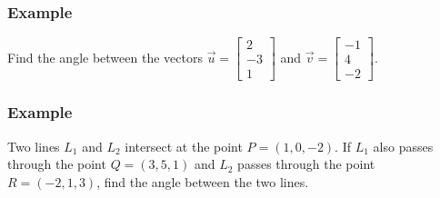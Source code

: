 \documentclass[11pt,t]{beamer}
\begin{document}
\begin{frame}
\frametitle{Example}
Find the angle between the vectors $\vec{u} = \begin{bmatrix}
2\\-3\\1\end{bmatrix}$ and $\vec{v} = \begin{bmatrix}
-1\\4\\-2
\end{bmatrix}$.


\end{frame}
\begin{frame}
\frametitle{Example}

Two lines $L_1$ and $L_2$ intersect at the point $P=(1,0,-2)$. If $L_1$ also passes through the point $Q=(3,5,1)$ and $L_2$ passes through the point $R=(-2,1,3)$, find the angle between the two lines.
\end{frame}
\end{document}
